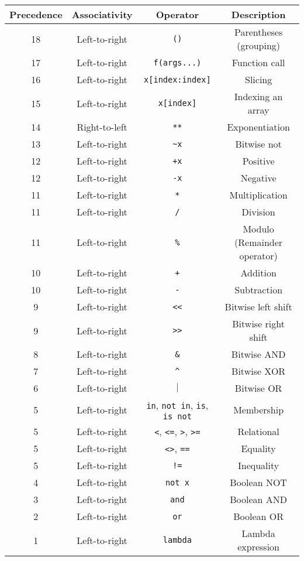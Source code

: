\documentclass[11pt]{article}
\begin{document}
\begin{center}
\begin{tabular}{c|c|c|c}
\textbf{Precedence} & \textbf{Associativity} & \textbf{Operator} & \textbf{Description}\\[0pt]
\hline
18 & Left-to-right & \texttt{()} & Parentheses (grouping)\\[0pt]
17 & Left-to-right & \texttt{f(args...)} & Function call\\[0pt]
16 & Left-to-right & \texttt{x[index:index]} & Slicing\\[0pt]
15 & Left-to-right & \texttt{x[index]} & Indexing an array\\[0pt]
14 & Right-to-left & \texttt{**} & Exponentiation\\[0pt]
13 & Left-to-right & \texttt{\textasciitilde{}x} & Bitwise not\\[0pt]
12 & Left-to-right & \texttt{+x} & Positive\\[0pt]
12 & Left-to-right & \texttt{-x} & Negative\\[0pt]
11 & Left-to-right & \texttt{*} & Multiplication\\[0pt]
11 & Left-to-right & \texttt{/} & Division\\[0pt]
11 & Left-to-right & \texttt{\%} & Modulo (Remainder operator)\\[0pt]
10 & Left-to-right & \texttt{+} & Addition\\[0pt]
10 & Left-to-right & \texttt{-} & Subtraction\\[0pt]
9 & Left-to-right & \texttt{<{}<{}} & Bitwise left shift\\[0pt]
9 & Left-to-right & \texttt{>{}>{}} & Bitwise right shift\\[0pt]
8 & Left-to-right & \texttt{\&} & Bitwise AND\\[0pt]
7 & Left-to-right & \texttt{\textasciicircum{}} & Bitwise XOR\\[0pt]
6 & Left-to-right & \(\vert{}\) & Bitwise OR\\[0pt]
5 & Left-to-right & \texttt{in}, \texttt{not in}, \texttt{is}, \texttt{is not} & Membership\\[0pt]
5 & Left-to-right & \texttt{<}, \texttt{<=}, \texttt{>}, \texttt{>=} & Relational\\[0pt]
5 & Left-to-right & \texttt{<>}, \texttt{==} & Equality\\[0pt]
5 & Left-to-right & \texttt{!=} & Inequality\\[0pt]
4 & Left-to-right & \texttt{not x} & Boolean NOT\\[0pt]
3 & Left-to-right & \texttt{and} & Boolean AND\\[0pt]
2 & Left-to-right & \texttt{or} & Boolean OR\\[0pt]
1 & Left-to-right & \texttt{lambda} & Lambda expression\\[0pt]
\end{tabular}
\end{center}
\end{document}
